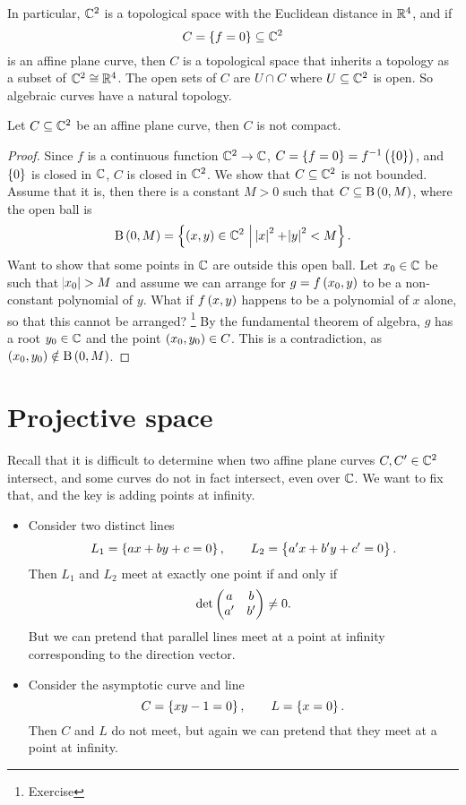 In particular, $ \mathbb{C}^2 $ is a topological space with the Euclidean distance in $ \mathbb{R}^4 $, and if
$$ C = \cbr{f = 0} \subseteq \CC^2 $$
is an affine plane curve, then $ C $ is a topological space that inherits a topology as a subset of $ \mathbb{C}^2 \cong \mathbb{R}^4 $. The open sets of $ C $ are $ U \cap C $ where $ U \subseteq \mathbb{C}^2 $ is open. So algebraic curves have a natural topology.

\begin{lemma}
Let $ C \subseteq \mathbb{C}^2 $ be an affine plane curve, then $ C $ is not compact.
\end{lemma}

\begin{proof}
Since $ f $ is a continuous function $ \mathbb{C}^2 \to \mathbb{C} $, $ C = \cbr{f = 0} = f^{-1}\br{\cbr{0}} $, and $ \cbr{0} $ is closed in $ \mathbb{C} $, $ C $ is closed in $ \mathbb{C}^2 $. We show that $ C \subseteq \mathbb{C}^2 $ is not bounded. Assume that it is, then there is a constant $ M > 0 $ such that $ C \subseteq \B\br{0, M} $, where the open ball is
$$ \B\br{0, M} = \cbr{\br{x, y} \in \CC^2 \st \abs{x}^2 + \abs{y}^2 < M}. $$
Want to show that some points in $ \mathbb{C} $ are outside this open ball. Let $ x_0 \in \mathbb{C} $ be such that $ \abs{x_0} > M $ and assume we can arrange for $ g = f\br{x_0, y} $ to be a non-constant polynomial of $ y $. What if $ f\br{x, y} $ happens to be a polynomial of $ x $ alone, so that this cannot be arranged? \footnote{Exercise} By the fundamental theorem of algebra, $ g $ has a root $ y_0 \in \mathbb{C} $ and the point $ \br{x_0, y_0} \in C $. This is a contradiction, as $ \br{x_0, y_0} \notin \B\br{0, M} $.
\end{proof}

\pagebreak

\section{Projective space}


Recall that it is difficult to determine when two affine plane curves $ C, C' \in \mathbb{C}^2 $ intersect, and some curves do not in fact intersect, even over $ \mathbb{C} $. We want to fix that, and the key is adding points at infinity.

\begin{example}
\hfill
\begin{itemize}
\item Consider two distinct lines
$$ L_1 = \cbr{ax + by + c = 0}, \qquad L_2 = \cbr{a'x + b'y + c' = 0}. $$
Then $ L_1 $ and $ L_2 $ meet at exactly one point if and only if
$$ \det \begin{pmatrix} a & b \\ a' & b' \end{pmatrix} \ne 0. $$
But we can pretend that parallel lines meet at a point at infinity corresponding to the direction vector.
\item Consider the asymptotic curve and line
$$ C = \cbr{xy - 1 = 0}, \qquad L = \cbr{x = 0}. $$
Then $ C $ and $ L $ do not meet, but again we can pretend that they meet at a point at infinity.
\end{itemize}
\end{example}

